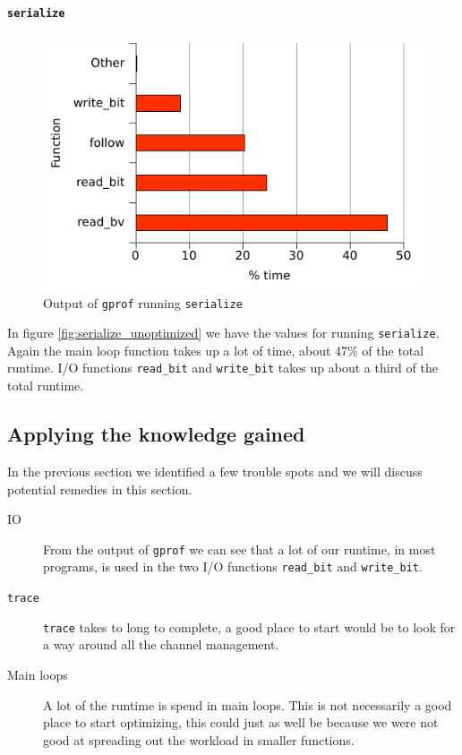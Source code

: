 \paragraph{\texttt{serialize}}
\begin{figure}
  \centering
  \includegraphics{optimizations/serialize_unoptimized.pdf}
  \caption{Output of \texttt{gprof} running \texttt{serialize}}
  \label{fig:serialize_unoptimized}
\end{figure}
In figure \vref{fig:serialize_unoptimized} we have the values for
running \texttt{serialize}. Again the main loop function takes up a
lot of time, about 47\% of the total runtime. I/O functions
\lstinline{read_bit} and \lstinline{write_bit} takes up about a third
of the total runtime.

\subsection{Applying the knowledge gained}

In the previous section we identified a few trouble spots and we will
discuss potential remedies in this section.
\begin{description}
\item[IO] From the output of \texttt{gprof} we can see that a lot of
  our runtime, in most programs, is used in the two I/O functions
  \lstinline{read_bit} and \lstinline{write_bit}.
\item[\texttt{trace}] \lstinline{trace} takes to long to complete, a
  good place to start would be to look for a way around all the
  channel management.
\item[Main loops] A lot of the runtime is spend in main loops. This is
  not necessarily a good place to start optimizing, this could just as
  well be because we were not good at spreading out the workload in
  smaller functions.
\end{description}


